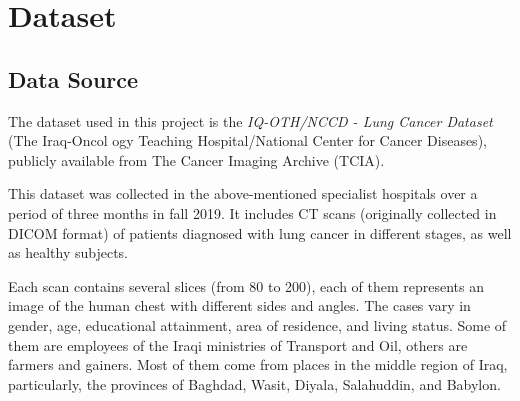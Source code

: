 
\section{Dataset}



\subsection{Data Source}

The dataset used in this project is the {\textit{IQ-OTH/NCCD - Lung Cancer Dataset}} (The Iraq-Oncol
ogy Teaching Hospital/National Center for Cancer Diseases), publicly available from The Cancer 
Imaging Archive (TCIA). \cite{subhajeet_das_2025}

This dataset was collected in the above-mentioned specialist hospitals over a period of three months 
in fall 2019. It includes CT scans (originally collected in DICOM format) of patients diagnosed 
with lung cancer in different stages, as well as healthy subjects. 

Each scan contains several slices (from 80 to 200), each of them represents an image of the human 
chest with different sides and angles. The cases vary in gender, age, educational attainment, area 
of residence, and living status. Some of them are employees of the Iraqi ministries of Transport and 
Oil, others are farmers and gainers. Most of them come from places in the middle region of Iraq,  
particularly, the provinces of Baghdad, Wasit, Diyala, Salahuddin, and Babylon.

